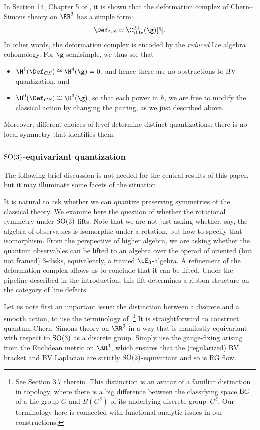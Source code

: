 \documentclass[10pt]{amsart}
\begin{document}
In Section 14, Chapter 5 of \cite{CosBook},
it is shown that the deformation complex of Chern--Simons theory on $\RR^3$ has a simple form:
\[
\Def_{CS} \simeq \C^{\geq 1}_{\Lie}(\g)[3].
\]
In other words, the deformation complex is encoded by the {\em reduced} Lie algebra cohomology.
For $\g$ semisimple, we thus see that 
\begin{itemize}
\item $\H^1(\Def_{CS}) \cong \H^4(\g) = 0$, 
and hence there are no obstructions to BV quantization, and
\item $\H^0(\Def_{CS}) \cong \H^3(\g)$, 
so that each power in $\hbar$, we are free to modify the classical action by changing the pairing,
as we just described above.
\end{itemize}
Moreover, different choices of level determine distinct quantizations: 
there is no local symmetry that identifies them.

\subsubsection{${\rm SO}(3)$-equivariant quantization}

The following brief discussion is not needed for the central results of this paper,
but it may illuminate some facets of the situation.

It is natural to ask whether we can quantize preserving symmetries of the classical theory.
We examine here the question of whether the rotational symmetry under ${\rm SO}(3)$ lifts.
Note that we are not just asking whether, say, the algebra of observables is isomorphic under a rotation,
but how to specify that isomorphism.
From the perspective of higher algebra, we are asking whether the quantum observables can be lifted to an algebra over the operad of oriented (but not framed) $3$-disks, equivalently, a framed $\cE_3$-algebra.
A refinement of the deformation complex allows us to conclude that it can be lifted.
Under the pipeline described in the introduction,
this lift determines a ribbon structure on the category of line defects.

Let us note first an important issue: the distinction between a discrete and a smooth action,
to use the terminology of \cite{CG1}.\footnote{See Section 3.7 therein.  
This distinction is an avatar of a familiar distinction in topology, where there is a big difference between the classifying space ${\rm B}G$ of a Lie group $G$ and $B(G^\delta)$ of its underlying discrete group~$G^\delta$. Our terminology here is connected with functional analytic issues in our constructions.}
It is straightforward to construct quantum Chern--Simons theory on $\RR^3$ in a way that is manifestly equivariant with respect to ${\rm SO}(3)$ as a discrete group.
Simply use the gauge-fixing arising from the Euclidean metric on $\RR^3$,
which ensures that the (regularized) BV bracket and BV Laplacian are strictly ${\rm SO}(3)$-equivariant 
and so is RG flow.
\end{document}
